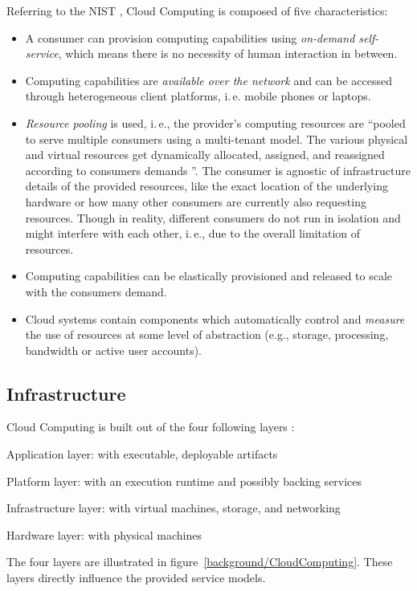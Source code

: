 Referring to the \acl{NIST} \cite{DefCC2011}, Cloud Computing is composed of five characteristics:
\begin{itemize}
\item A consumer can provision computing capabilities using \textit{on-demand self-service}, which means there is no necessity of human interaction in between.
\item Computing capabilities are \textit{available over the network} and can be accessed through heterogeneous client platforms, i.\,e. mobile phones or laptops.
\item \textit{Resource pooling} is used, i.\,e., the provider’s computing resources are ``pooled to serve multiple consumers using a multi-tenant model. The various physical and virtual resources get dynamically allocated, assigned, and reassigned according to consumers demands \citep[p. 2]{DefCC2011}''.
The consumer is agnostic of infrastructure details of the provided resources, like the exact location of the underlying hardware or how many other consumers are currently also requesting resources.
Though in reality, different consumers do not run in isolation and might interfere with each other, i.\,e., due to the overall limitation of resources.
\item Computing capabilities can be elastically provisioned and released to scale with the consumers demand.
\item Cloud systems contain components which automatically control and \textit{measure} the use of resources at some level of abstraction (e.g., storage, processing, bandwidth or active user accounts).
\end{itemize}
\subsection{Infrastructure}
\label{bac:CCInfra}
Cloud Computing is built out of the four following layers \citep[p. 2]{DefCC2011}:
\begin{etaremune}
	\item Application layer: with executable, deployable artifacts
	\item Platform layer: with an execution runtime and possibly backing services
	\item Infrastructure layer: with virtual machines, storage, and networking
	\item Hardware layer: with physical machines
\end{etaremune}

The four layers are illustrated in figure~\ref{background/CloudComputing}. 
These layers directly influence the provided service models. 

